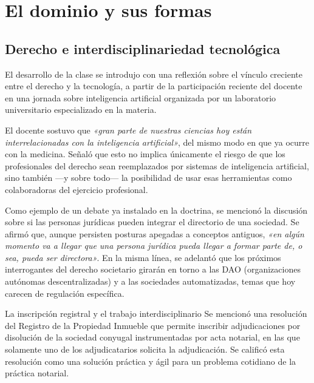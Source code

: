 \documentclass[12pt,oneside]{book}
\begin{document}
\chapter{El dominio y sus formas}

\section{Derecho e interdisciplinariedad tecnológica}

El desarrollo de la clase se introdujo con una reflexión sobre el vínculo creciente entre el derecho y la tecnología, a partir de la participación reciente del docente en una jornada sobre inteligencia artificial organizada por un laboratorio universitario especializado en la materia.

El docente sostuvo que \textit{«gran parte de nuestras ciencias hoy están interrelacionadas con la inteligencia artificial»}, del mismo modo en que ya ocurre con la medicina. Señaló que esto no implica únicamente el riesgo de que los profesionales del derecho sean reemplazados por sistemas de inteligencia artificial, sino también ---y sobre todo--- la posibilidad de usar esas herramientas como colaboradoras del ejercicio profesional.

Como ejemplo de un debate ya instalado en la doctrina, se mencionó la discusión sobre si las personas jurídicas pueden integrar el directorio de una sociedad. Se afirmó que, aunque persisten posturas apegadas a conceptos antiguos, \textit{«en algún momento va a llegar que una persona jurídica pueda llegar a formar parte de, o sea, pueda ser directora»}. En la misma línea, se adelantó que los próximos interrogantes del derecho societario girarán en torno a las DAO (organizaciones autónomas descentralizadas) y a las sociedades automatizadas, temas que hoy carecen de regulación específica.

\begin{example}{La inscripción registral y el trabajo interdisciplinario}
Se mencionó una resolución del Registro de la Propiedad Inmueble que permite inscribir adjudicaciones por disolución de la sociedad conyugal instrumentadas por acta notarial, en las que solamente uno de los adjudicatarios solicita la adjudicación. Se calificó esta resolución como una solución práctica y ágil para un problema cotidiano de la práctica notarial.
\end{example}
\end{document}
